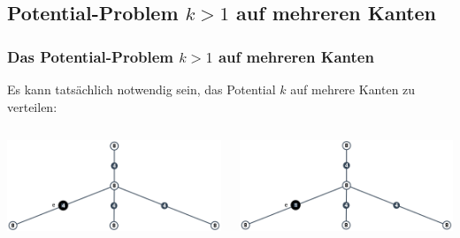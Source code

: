 \documentclass{beamer}
\begin{document}
	\subsection{Potential-Problem $k > 1$ auf mehreren Kanten}
	\begin{frame}
		\frametitle{Das Potential-Problem $k > 1$ auf mehreren Kanten}
		\large
		
		Es kann tatsächlich notwendig sein, das Potential $k$ auf mehrere Kanten zu verteilen:
		
		\begin{columns}[T] %
			\begin{column}{.5\textwidth}
				\centering
				\includegraphics[width=\textwidth]{bilder/abb1_NEU2.png}
			\end{column}%
			\hfill%
			\begin{column}{.5\textwidth}
				\centering
				\includegraphics[width=\textwidth]{bilder/abb2_NEU2.png}
			\end{column}
		\end{columns}

		
	\end{frame}
	
\end{document}
